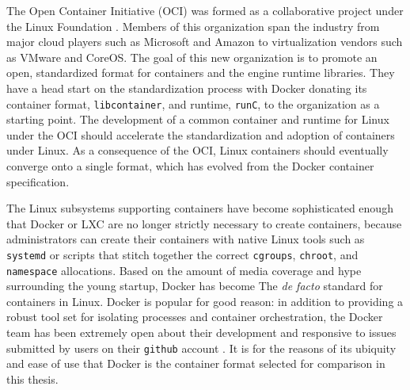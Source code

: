 The Open Container Initiative (OCI) was formed as a collaborative project under the Linux Foundation \autocite{_oci_1}.
Members of this organization span the industry from major cloud players such as Microsoft and Amazon to virtualization vendors such as VMware and CoreOS.  
The goal of this new organization is to promote an open, standardized format for containers and the engine runtime libraries. 
They have a head start on the standardization process with Docker donating its container format, \texttt{libcontainer}, and runtime, \texttt{runC}, to the organization as a starting point.
The development of a common container and runtime for Linux under the OCI should accelerate the standardization and adoption of containers under Linux.
As a consequence of the OCI, Linux containers should eventually converge onto a single format, which has evolved from the Docker container specification.   

The Linux subsystems supporting containers have become sophisticated enough that Docker or LXC are no longer strictly necessary to create containers, because administrators can create their containers with native Linux  tools such as \texttt{systemd} or scripts that stitch together the correct \texttt{cgroups}, \texttt{chroot}, and \texttt{namespace} allocations. 
Based on the amount of media coverage and hype surrounding the young startup, Docker has become The \emph{de facto} standard for containers in Linux.  
Docker is popular for good reason: in addition to providing a robust tool set for isolating processes and container orchestration, the Docker team has been extremely open about their development and responsive to issues submitted by users on their \texttt{github} account \autocite{githubdocker}.  
It is for the reasons of its ubiquity and ease of use that Docker is the container format selected for comparison in this thesis.

